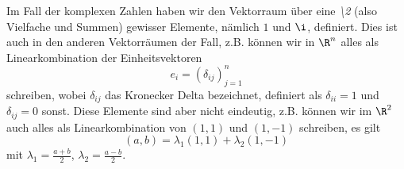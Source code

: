 \documentclass[letterpaper,10pt,english]{jupyterBook}
\begin{document}
Im Fall der komplexen Zahlen haben wir den Vektorraum über eine \emph{\textbackslash{}2} (also Vielfache und Summen) gewisser Elemente, nämlich \(1\) und \(\i\), definiert. Dies ist auch in den anderen Vektorräumen der Fall, z.B. können wir in \(\R^n\) alles als Linearkombination der Einheitsvektoren
\begin{equation*}
 e_i = (\delta_{ij})_{j=1}^n
\end{equation*}
schreiben, wobei \(\delta_{ij}\) das Kronecker Delta bezeichnet, definiert als \(\delta_{ii}=1\) und \(\delta_{ij}=0\) sonst. Diese Elemente sind aber nicht eindeutig, z.B. können wir im \(\R^2\) auch alles als Linearkombination von \((1,1)\) und \((1,-1)\) schreiben, es gilt
\begin{equation*}
 (a,b) = \lambda_1 (1,1) + \lambda_2 (1,-1)
\end{equation*}
mit \(\lambda_1 = \frac{a+b}2\), \(\lambda_2 = \frac{a-b}2\).
\label{vektorraeume/vektorraeume:definition-5}
\end{document}
